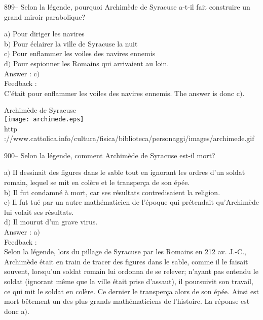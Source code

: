 \documentclass[letterpaper, 12pt]{article}
\begin{document}
899-- Selon la l\'egende, pourquoi Archim\`ede de Syracuse a-t-il
fait construire un grand miroir parabolique?

a$)$ Pour diriger les navires \\
b$)$ Pour \'eclairer la ville de Syracuse la nuit \\
c$)$ Pour enflammer les voiles des navires ennemis \\
d$)$ Pour espionner les Romains qui arrivaient au loin.\\

Answer : c$)$\\

Feedback : \\
C'\'etait pour enflammer les voiles des navires ennemis. The answer is
donc c$)$.\\

        \begin{center}
        Archim\`ede de Syracuse\\
    \texttt{[image: archimede.eps]}\\
        {\footnotesize http
://www.cattolica.info/cultura/fisica/biblioteca/personaggi/images/archimede.gif}
    \end{center}

900-- Selon la l\'egende, comment Archim\`ede de Syracuse est-il
mort?

a$)$ Il dessinait des figures dans le sable tout en ignorant les ordres d'un
soldat romain, lequel se mit en col\`ere
et le transper\c ca de son \'ep\'ee. \\
b$)$ Il fut condamn\'e \`a mort, car ses r\'esultats contredisaient la
religion. \\
c$)$ Il fut tu\'e par un autre math\'ematicien de l'\'epoque qui
pr\'etendait qu'Archim\`ede lui volait ses r\'esultats. \\
d$)$ Il mourut d'un grave virus.\\

Answer : a$)$\\

Feedback :\\
Selon la l\'egende, lors du pillage de Syracuse par les Romains en
212 av. J.-C., Archim\`ede \'etait en train de tracer des figures
dans le sable, comme il le faisait souvent, lorsqu'un soldat romain
lui ordonna de se relever; n'ayant pas entendu le soldat (ignorant
m\^eme que la ville \'etait prise d'assaut), il poursuivit son
travail, ce qui mit le soldat en col\`ere. Ce dernier le transper\c
ca alors de son \'ep\'ee. Ainsi est mort
b\^etement un des plus grands math\'ematiciens de l'histoire. La r\'eponse
est donc a$)$.\\
\end{document}
